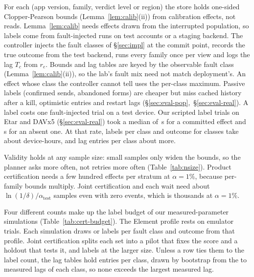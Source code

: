  For each (app version, family, verdict level or region) the store holds one-sided Clopper-Pearson bounds (Lemma~\ref{lem:calib}(ii)) from calibration
effects, not reads. Lemma~\ref{lem:calib} needs effects drawn from the interrupted population, so labels come from fault-injected runs on test accounts or a staging backend.
The controller injects the fault classes of \S\ref{sec:impl} at the commit point, records the true outcome from the test backend, runs every family once per view and logs the lag $T_c$ from $r_e$. Bounds and lag tables are keyed by the observable fault class (Lemma~\ref{lem:calib}(ii)), so the lab's fault mix need not
match deployment's. An effect whose class the controller cannot tell uses the per-class maximum. Passive labels (confirmed sends, abandoned forms) are cheaper but miss cached history after a
kill, optimistic entries and restart lags (\S\ref{sec:eval-pop},~\S\ref{sec:eval-real}). A label costs one fault-injected trial on a test device. Our scripted label trials on Etar and DAVx5 (\S\ref{sec:eval-real}) took a median of \CertLabelMedOneS\,s for a committed
effect and \CertLabelMedZeroS\,s for an absent one. At that rate, \CertLabelsFive labels per class and outcome
for \CertClassesN classes take about \CertDeviceHoursFive device-hours, and \CertLagBootN{} lag entries per class about \CertDeviceHoursLagFive{} more.

 Validity holds at any sample size: small samples only widen the bounds, so the planner asks more often, not retries more often (Table~\ref{tab:nsize}).
Product certification needs a few hundred effects per stratum at $\alpha{=}1\%$, because per-family bounds multiply. Joint certification and each wait need about $\ln(1/\delta)/\alpha_{\mathrm{test}}$ samples even with zero events, which is thousands at $\alpha{=}1\%$.

Four different counts make up the label budget of our measured-parameter simulations (Table~\ref{tab:cert-budget}). The Element profile rests on \CertElemTrialsN emulator trials.
Each simulation draws \CertLabelsBase or \CertLabelsFive labels per fault class and outcome from that profile. Joint certification splits each set into a pilot that fixes the score
and a holdout that tests it, \CertPilotFive and \CertHoldoutFive labels at the larger size. Unless a row ties them to the label count, the lag tables hold \CertLagBootN entries per class, drawn by bootstrap from the \RsimLagSrcLo{} to \RsimLagSrcHi{} measured lags of each class, so none exceeds the largest measured lag.

